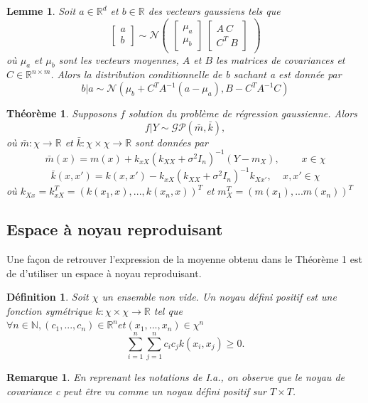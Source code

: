 \documentclass[a4paper,12pt]{article}
\newtheorem{definition}{Définition}
\newtheorem{lemma}{Lemme}
\newtheorem{theorem}{Théorème}
\newtheorem{remark}{Remarque}
\begin{document}
\begin{lemma}
    Soit $a\in\mathbb{R}^d$ et $b\in\mathbb{R}$ des vecteurs gaussiens tels que 
$$
\begin{bmatrix} a \\ b \end{bmatrix} \sim \mathcal{N} \begin{pmatrix} \begin{bmatrix} \mu_a \\ \mu_b \end{bmatrix} \ \begin{bmatrix} A \ C \\ C^T \ B \end{bmatrix} \end{pmatrix}
$$
où $\mu_a$ et $\mu_b$ sont les vecteurs moyennes, $A$ et $B$ les matrices de covariances et $C\in\mathbb{R}^{n\times m}$.
Alors la distribution conditionnelle de b sachant a est donnée par
$$ b|a \sim \mathcal{N}(\mu_b+C^TA^{-1}(a-\mu_a),B-C^TA^{-1}C) $$
\end{lemma}

\begin{theorem}
    Supposons $f$ solution du problème de régression gaussienne. Alors
$$ f|Y\sim\mathcal{GP}(\bar{m},\bar{k}),
$$
où $\bar{m}:\chi\to\mathbb{R}$ et $\bar{k}:\chi\times\chi\to\mathbb{R}$ sont données par
$$ \bar{m}(x)=m(x)+k_{xX}(k_{XX}+\sigma^2I_n)^{-1}(Y-m_X),~~~~~~~~~~x\in\chi $$
$$ \bar{k}(x,x')=k(x,x')-k_{xX}(k_{XX}+\sigma^2I_n)^{-1}k_{Xx'}, ~~~~~ x, x'\in\chi$$
où $k_{Xx}=k_{xX}^{T}=(k(x_1,x),...,k(x_n,x))^{T}$ et $m_X^{T}=(m(x_1),...m(x_n))^{T}$
\end{theorem}

\subsection{Espace à noyau reproduisant}

Une façon de retrouver l'expression de la moyenne obtenu dans le Théorème 1 est
de d'utiliser un espace à noyau reproduisant.

\begin{definition}
    Soit $\chi$ un ensemble non vide. Un noyau défini positif est une fonction symétrique $k : \chi \times \chi \to \mathbb{R}$ tel que $\forall n \in \mathbb{N}, (c_1,...,c_n) \in \mathbb{R}^n et (x_1,...,x_n) \in \chi^n$
$$
\sum_{i=1}^n \sum_{j=1}^n c_i c_j k(x_i,x_j) \ge 0.
$$
\end{definition}

\begin{remark}
    En reprenant les notations de I.a., on observe que le noyau de covariance c peut 
    être vu comme un noyau défini positif sur $T \times T$. 
\end{remark}
\end{document}
